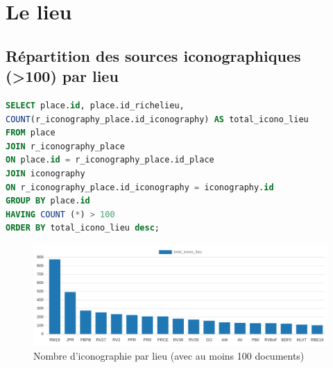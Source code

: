 \section{Le lieu}
\subsection{Répartition des sources iconographiques (>100) par lieu}
\begin{lstlisting}[language=SQL, caption=Requête SQL pour nombre d'iconographies par lieu > 100]
SELECT place.id, place.id_richelieu,  
COUNT(r_iconography_place.id_iconography) AS total_icono_lieu 
FROM place 
JOIN r_iconography_place 
ON place.id = r_iconography_place.id_place 
JOIN iconography  
ON r_iconography_place.id_iconography = iconography.id 
GROUP BY place.id 
HAVING COUNT (*) > 100
ORDER BY total_icono_lieu desc; \end{lstlisting}

\begin{figure}[h!]
    \centering
    \includegraphics[width=1\linewidth]{images/graphiques/nb_icono_lieu_>100.png}
    \caption{Nombre d'iconographie par lieu (avec au moins 100 documents)}
    \label{fig:nb_icono_lieu>100}
\end{figure}    

\newpage
